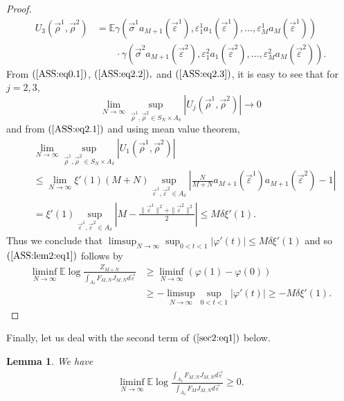 \documentclass[12pt]{article}
\def\eps{{\varepsilon}}
\newcommand{\veps}{\vec{\varepsilon}}
\newcommand{\vsi}{{\vec{\sigma}}}
\newcommand{\vrho}{{\vec{\rho}}}
\newtheorem{lemma}{\bf Lemma}
\newenvironment{Proof of lemma}{\noindent{\bf Proof of Lemma}}{\hfill$\Box$\newline}
\newenvironment{Proof of theorem}{\noindent{\bf Proof of Theorem}}{\hfill{\footnotesize${\square}$}\newline}
\newenvironment{Proof of theorems}{\noindent{\bf Proof of Theorems}}{\hfill$\Box$\newline}
\newenvironment{Proof of proposition}{\noindent{\bf Proof of Proposition}}{\hfill$\Box$\newline}
\newenvironment{Proof of propositions}{\noindent{\bf Proof of Propositions}}{\hfill$\Box$\newline}
\newenvironment{Proof of exercise}{\noindent{\it Proof of Exercise:}}{\hfill$\Box$}
\numberwithin{equation}{section}
\begin{document}
\begin{proof}
\begin{align*}
U_3(\vrho^1,\vrho^2)&=\mathbb{E}\gamma(\vsi^1a_{M+1}(\veps^1),\eps_1^1a_1(\veps^1),\ldots,\eps_M^1a_M(\veps^1))\\
&\qquad\cdot\gamma(\vsi^2a_{M+1}(\veps^2),\eps_1^2a_1(\veps^2),\ldots,\eps_M^2a_M(\veps^2)).
\end{align*}
From $(\ref{ASS:eq0.1})$, $(\ref{ASS:eq2.2}),$ and $(\ref{ASS:eq2.3})$, it is easy to see that for $j=2,3,$
$$\lim_{N\rightarrow\infty}\sup_{\vrho^1,\vrho^2\in S_N\times A_\delta}|U_j(\vrho^1,\vrho^2)|\rightarrow 0$$
and from $(\ref{ASS:eq2.1})$ and using mean value theorem,
\begin{align*}
&\lim_{N\rightarrow\infty}\sup_{\vrho^1,\vrho^2\in S_N\times A_\delta}|U_1(\vrho^1,\vrho^2)|\\
&\leq \lim_{N\rightarrow\infty}\xi'(1)(M+N)\sup_{\veps^1,\veps^2\in A_\delta}\left|\frac{N}{M+N}a_{M+1}(\veps^1)a_{M+1}(\veps^2)-1\right|\\
&=\xi'(1)\sup_{\veps^1,\veps^2\in A_\delta}\left|M-\frac{\|\veps^1\|^2+\|\veps^2\|^2}{2}\right|\leq M\delta\xi'(1).
\end{align*}
Thus we conclude that $\limsup_{N\rightarrow\infty}\sup_{0<t<1}|\varphi'(t)|\leq M\delta\xi'(1)$ and so $(\ref{ASS:lem2:eq1})$ follows by
\begin{align*}
\liminf_{N\rightarrow\infty}\mathbb{E}\log \frac{Z_{M+N}}{\int_{A_\delta}F_{M,N}J_{M,N}d\veps}&\geq \liminf_{N\rightarrow\infty}(\varphi(1)-\varphi(0))\\
&\geq -\limsup_{N\rightarrow\infty}\sup_{0<t<1}|\varphi'(t)|\geq -M\delta\xi'(1).
\end{align*}
\end{proof}

\noindent Finally, let us deal with the second term of $(\ref{sec2:eq1})$ below.

\begin{lemma}\label{ASS:lem3} We have
\begin{align}\label{ASS:lem3:eq1}
\liminf_{N\rightarrow\infty}\mathbb{E}\log\frac{\int_{A_\delta}F_{M,N}J_{M,N}d\veps}{\int_{A_\delta}F_{M}J_{M,N}d\veps}\geq 0.
\end{align}

\end{lemma}
\end{document}
